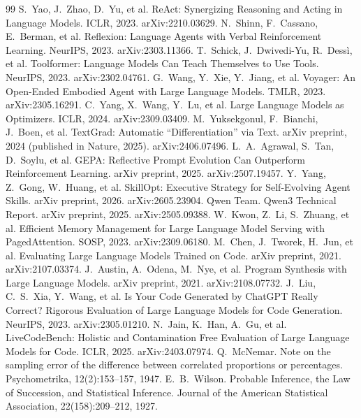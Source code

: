\documentclass[11pt]{article}
\begin{document}
\begin{thebibliography}{99}
\small
{} S.\ Yao, J.\ Zhao, D.\ Yu, et al. ReAct: Synergizing Reasoning and Acting in Language Models. ICLR, 2023. arXiv:2210.03629.
 N.\ Shinn, F.\ Cassano, E.\ Berman, et al. Reflexion: Language Agents with Verbal Reinforcement Learning. NeurIPS, 2023. arXiv:2303.11366.
 T.\ Schick, J.\ Dwivedi-Yu, R.\ Dess\`i, et al. Toolformer: Language Models Can Teach Themselves to Use Tools. NeurIPS, 2023. arXiv:2302.04761.
 G.\ Wang, Y.\ Xie, Y.\ Jiang, et al. Voyager: An Open-Ended Embodied Agent with Large Language Models. TMLR, 2023. arXiv:2305.16291.
 C.\ Yang, X.\ Wang, Y.\ Lu, et al. Large Language Models as Optimizers. ICLR, 2024. arXiv:2309.03409.
 M.\ Yuksekgonul, F.\ Bianchi, J.\ Boen, et al. TextGrad: Automatic ``Differentiation'' via Text. arXiv preprint, 2024 (published in Nature, 2025). arXiv:2406.07496.
 L.\ A.\ Agrawal, S.\ Tan, D.\ Soylu, et al. GEPA: Reflective Prompt Evolution Can Outperform Reinforcement Learning. arXiv preprint, 2025. arXiv:2507.19457.
 Y.\ Yang, Z.\ Gong, W.\ Huang, et al. SkillOpt: Executive Strategy for Self-Evolving Agent Skills. arXiv preprint, 2026. arXiv:2605.23904.
 Qwen Team. Qwen3 Technical Report. arXiv preprint, 2025. arXiv:2505.09388.
 W.\ Kwon, Z.\ Li, S.\ Zhuang, et al. Efficient Memory Management for Large Language Model Serving with PagedAttention. SOSP, 2023. arXiv:2309.06180.
 M.\ Chen, J.\ Tworek, H.\ Jun, et al. Evaluating Large Language Models Trained on Code. arXiv preprint, 2021. arXiv:2107.03374.
 J.\ Austin, A.\ Odena, M.\ Nye, et al. Program Synthesis with Large Language Models. arXiv preprint, 2021. arXiv:2108.07732.
 J.\ Liu, C.\ S.\ Xia, Y.\ Wang, et al. Is Your Code Generated by ChatGPT Really Correct? Rigorous Evaluation of Large Language Models for Code Generation. NeurIPS, 2023. arXiv:2305.01210.
 N.\ Jain, K.\ Han, A.\ Gu, et al. LiveCodeBench: Holistic and Contamination Free Evaluation of Large Language Models for Code. ICLR, 2025. arXiv:2403.07974.
 Q.\ McNemar. Note on the sampling error of the difference between correlated proportions or percentages. Psychometrika, 12(2):153--157, 1947.
 E.\ B.\ Wilson. Probable Inference, the Law of Succession, and Statistical Inference. Journal of the American Statistical Association, 22(158):209--212, 1927.
\end{thebibliography}
\end{document}
